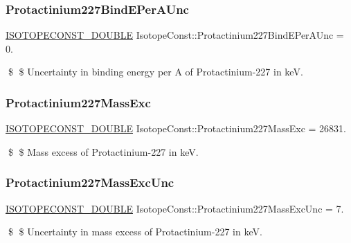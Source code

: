 \subsubsection{\texorpdfstring{Protactinium227\+Bind\+E\+Per\+A\+Unc}{Protactinium227BindEPerAUnc}}
{\footnotesize\ttfamily \mbox{\hyperlink{group___isotope_const-_macros_ga8f45a7272ce02c0b4c65c44636ed719a}{I\+S\+O\+T\+O\+P\+E\+C\+O\+N\+S\+T\+\_\+\+D\+O\+U\+B\+LE}} Isotope\+Const\+::\+Protactinium227\+Bind\+E\+Per\+A\+Unc = 0.}

\$ \$ Uncertainty in binding energy per A of Protactinium-\/227 in keV. \mbox{\label{group___isotope_const-_protactinium-_pa227_ga7b938113391c9e474499f24c2912b71d}} 
\subsubsection{\texorpdfstring{Protactinium227\+Mass\+Exc}{Protactinium227MassExc}}
{\footnotesize\ttfamily \mbox{\hyperlink{group___isotope_const-_macros_ga8f45a7272ce02c0b4c65c44636ed719a}{I\+S\+O\+T\+O\+P\+E\+C\+O\+N\+S\+T\+\_\+\+D\+O\+U\+B\+LE}} Isotope\+Const\+::\+Protactinium227\+Mass\+Exc = 26831.}

\$ \$ Mass excess of Protactinium-\/227 in keV. \mbox{\label{group___isotope_const-_protactinium-_pa227_ga320ff2a16d9277ccf1ca2eb250fc635e}} 
\subsubsection{\texorpdfstring{Protactinium227\+Mass\+Exc\+Unc}{Protactinium227MassExcUnc}}
{\footnotesize\ttfamily \mbox{\hyperlink{group___isotope_const-_macros_ga8f45a7272ce02c0b4c65c44636ed719a}{I\+S\+O\+T\+O\+P\+E\+C\+O\+N\+S\+T\+\_\+\+D\+O\+U\+B\+LE}} Isotope\+Const\+::\+Protactinium227\+Mass\+Exc\+Unc = 7.}

\$ \$ Uncertainty in mass excess of Protactinium-\/227 in keV. \mbox{\label{group___isotope_const-_protactinium-_pa227_ga0294802d403d792d68ec767531ac75c7}} 
